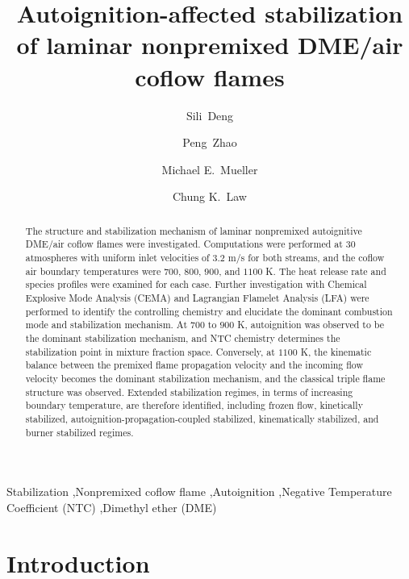 \documentclass[review,3p,times]{elsarticle}
\begin{document}
\begin{frontmatter}

\title{Autoignition-affected stabilization of laminar nonpremixed DME/air coflow flames}

\author{Sili~Deng}
\author{Peng~Zhao}
\author{Michael E.~Mueller}
\author{Chung K.~Law}

\address{Department of Mechanical and Aerospace Engineering, Princeton University, Princeton, NJ 08544, USA}

\begin{abstract}

The structure and stabilization mechanism of laminar nonpremixed autoignitive DME/air coflow flames were investigated.  Computations were performed at $30$ atmospheres with uniform inlet velocities of $3.2$ m/s for both streams, and the coflow air boundary temperatures were $700$, $800$, $900$, and $1100$ K.  The heat release rate and species profiles were examined for each case. Further investigation with Chemical Explosive Mode Analysis (CEMA) and Lagrangian Flamelet Analysis (LFA) were performed to identify the controlling chemistry and elucidate the dominant combustion mode and stabilization mechanism.  At $700$ to $900$ K, autoignition was observed to be the dominant stabilization mechanism, and NTC chemistry determines the stabilization point in mixture fraction space.  Conversely, at $1100$ K, the kinematic balance between the premixed flame propagation velocity and the incoming flow velocity becomes the dominant stabilization mechanism, and the classical triple flame structure was observed.  Extended stabilization regimes, in terms of increasing boundary temperature, are therefore identified, including frozen flow, kinetically stabilized, autoignition-propagation-coupled stabilized, kinematically stabilized, and burner stabilized regimes.           

\end{abstract}

\begin{keyword} 
Stabilization \sep Nonpremixed coflow flame \sep Autoignition \sep Negative Temperature Coefficient (NTC) \sep Dimethyl ether (DME) 
\end{keyword}

\end{frontmatter}


\section{Introduction}
\end{document}
